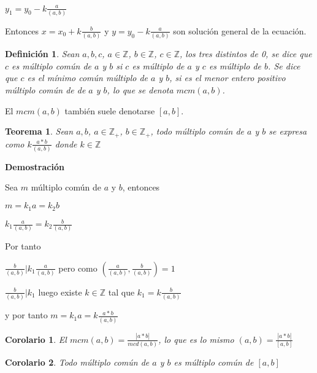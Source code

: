 \documentclass[a4paper,1pt]{report}
\newtheorem*{teo}{Teorema}
\newtheorem*{cor}{Corolario}
\newtheorem*{dfn}{Definición}
\begin{document}
$y_1=y_0-k\frac{a}{(a,b)}$

Entonces $x=x_0+k\frac{b}{(a,b)}$ y $y=y_0-k\frac{a}{(a,b)}$ son solución general de la ecuación.

\begin{dfn}
 Sean $a,b,c$, $a\in\mathbb{Z}$, $b\in\mathbb{Z}$, $c\in\mathbb{Z}$, los tres distintos de 0, se dice que $c$ es múltiplo común de $a$ y $b$ si $c$ es múltiplo de $a$ y $c$ es múltiplo de $b$. Se dice que $c$ es el mínimo común múltiplo de $a$ y $b$, si es el menor entero positivo múltiplo común de de $a$ y $b$, lo que se denota $mcm(a,b)$.
\end{dfn}

El $mcm(a,b)$ también suele denotarse $[a,b]$.



\begin{teo}
 Sean $a,b$, $a\in\mathbb{Z}_+$, $b\in\mathbb{Z}_+$, todo múltiplo común de $a$ y $b$ se expresa como $k\frac{a*b}{(a,b)}$ donde $k\in\mathbb{Z}$
\end{teo}

\textbf{Demostración}


Sea $m$ múltiplo común de $a$ y $b$, entonces

$m=k_1a=k_2b$

$k_1\frac{a}{(a,b)}=k_2\frac{b}{(a,b)}$

Por tanto

$\frac{b}{(a,b)}|k_1\frac{a}{(a,b)}$ pero como $(\frac{a}{(a,b)},\frac{b}{(a,b)})=1$

$\frac{b}{(a,b)}|k_1$ luego existe $k\in\mathbb{Z}$ tal que $k_1=k\frac{b}{(a,b)}$

y por tanto $m=k_1a=k\frac{a*b}{(a,b)}$

\begin{cor}
 El $mcm(a,b)=\frac{|a*b|}{mcd(a,b)}$, lo que es lo mismo $(a,b)=\frac{|a*b|}{[a,b]}$
\end{cor}

\begin{cor}
 Todo múltiplo común de $a$ y $b$ es múltiplo común de $[a,b]$
\end{cor}
\end{document}
